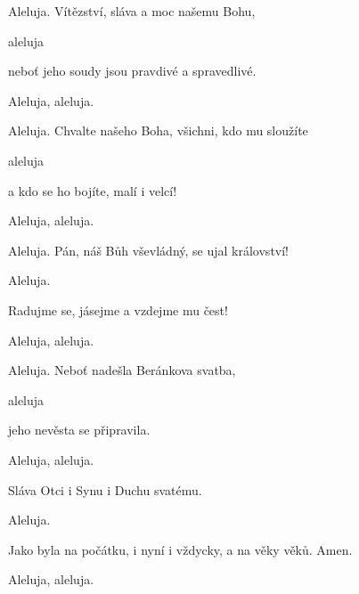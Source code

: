 \begin{psalmus}

Aleluja.
Vítězství, sláva a moc našemu Bohu, 

 aleluja

neboť jeho soudy jsou pravdivé a spravedlivé. 

 Aleluja, aleluja.

Aleluja. 
Chvalte našeho Boha, všichni, kdo mu sloužíte 

 aleluja

a kdo se ho bojíte, malí i velcí! 

 Aleluja, aleluja.

Aleluja. 
Pán, náš Bůh vševládný, se ujal království! 

 Aleluja.

Radujme se, jásejme a vzdejme mu čest! 

 Aleluja, aleluja.

Aleluja. 
Neboť nadešla Beránkova svatba, 

 aleluja

jeho nevěsta se připravila. 

 Aleluja, aleluja. 

Sláva Otci i Synu i Duchu svatému.

 Aleluja.

Jako byla na počátku, i nyní i vždycky, a na věky věků. Amen.

 Aleluja, aleluja. 
\end{psalmus}
